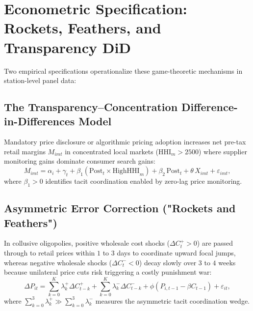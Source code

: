 \documentclass[11pt]{article}
\begin{document}
\section{Econometric Specification: Rockets, Feathers, and Transparency DiD}
\label{sec:econometric-models}
Two empirical specifications operationalize these game-theoretic mechanisms in station-level panel data:

\subsection{The Transparency--Concentration Difference-in-Differences Model}
Mandatory price disclosure or algorithmic pricing adoption increases net pre-tax retail margins $M_{imt}$ in concentrated local markets ($\text{HHI}_m > 2500$) where supplier monitoring gains dominate consumer search gains:
\begin{equation}
M_{imt} = \alpha_i + \gamma_t + \beta_1 \left(\text{Post}_t \times \text{HighHHI}_m\right) + \beta_2\,\text{Post}_t + \theta\,X_{imt} + \varepsilon_{imt},
\label{eq:did-transparency}
\end{equation}
where $\beta_1 > 0$ identifies tacit coordination enabled by zero-lag price monitoring.

\subsection{Asymmetric Error Correction ("Rockets and Feathers")}
In collusive oligopolies, positive wholesale cost shocks ($\Delta C_t^+ > 0$) are passed through to retail prices within $1$ to $3$ days to coordinate upward focal jumps, whereas negative wholesale shocks ($\Delta C_t^- < 0$) decay slowly over $3$ to $4$ weeks because unilateral price cuts risk triggering a costly punishment war:
\begin{equation}
\Delta P_{it} = \sum_{k=0}^{K} \lambda_k^+ \Delta C_{t-k}^+ + \sum_{k=0}^{K} \lambda_k^- \Delta C_{t-k}^- + \phi\left(P_{i,t-1} - \beta C_{t-1}\right) + \varepsilon_{it},
\label{eq:rockets-feathers-ecm}
\end{equation}
where $\sum_{k=0}^{3} \lambda_k^+ \gg \sum_{k=0}^{3} \lambda_k^-$ measures the asymmetric tacit coordination wedge.
\end{document}
